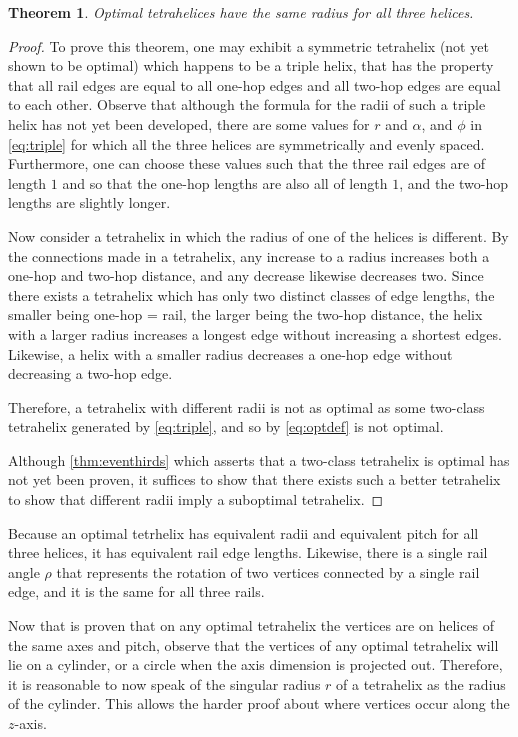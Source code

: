 \documentclass[10pt,final]{journals-1.0/asme2ej}
\newtheorem{theorem}{Theorem}
\begin{document}
\begin{theorem}
  Optimal tetrahelices have the same radius for all three helices.
\end{theorem}
\begin{proof}
To prove this theorem, one may exhibit a symmetric tetrahelix (not yet shown to be optimal) which
happens to be a triple helix, that has
the property that all rail edges are equal to all one-hop edges and all two-hop
edges are equal to each other. 
Observe that although the formula for the
radii of such a triple helix has not yet been developed,
there are some values for $r$ and $\alpha$, and $\phi$
in \cref{eq:triple}
for which all the three helices are symmetrically and evenly spaced. Furthermore,
one can choose these values such that the three rail edges are of length $1$ and
so that the one-hop lengths are also all of length $1$, and the two-hop lengths
are slightly longer.

Now consider a tetrahelix in which the radius of one of the helices is different.
By the connections made in a tetrahelix, any increase to a radius increases both
a one-hop and two-hop distance, and any decrease likewise decreases two.
Since there exists a tetrahelix which has only two distinct classes of edge lengths,
the smaller being one-hop = rail, the larger being the two-hop distance, the helix
with a larger radius increases a longest edge without increasing a shortest edges.
Likewise, a helix with a smaller radius decreases a one-hop edge without decreasing
a two-hop edge.

Therefore, a tetrahelix with different radii is not as optimal as some two-class 
tetrahelix generated by \cref{eq:triple}, and so by \cref{eq:optdef} is not optimal.


Although \cref{thm:eventhirds} which asserts that a two-class tetrahelix is optimal
has not yet been proven, it suffices to show that there
exists such a better tetrahelix to show that different radii imply a suboptimal
tetrahelix.
\end{proof}

Because an optimal tetrhelix has equivalent radii and equivalent pitch for all three helices,
it has equivalent rail edge lengths. Likewise, there is a single rail angle $\rho$ that
represents the rotation of two vertices connected by a single rail edge, and it is the same
for all three rails.

Now that is proven that on any optimal tetrahelix the vertices
are on helices of the same axes and pitch, observe that the vertices 
of any optimal tetrahelix will lie on a cylinder, or a circle when the axis dimension
is projected out. Therefore, it is reasonable to now speak of the singular radius $r$
of a tetrahelix as the radius of the cylinder.
This allows
the harder proof about where vertices occur along the $z$-axis.
\end{document}
